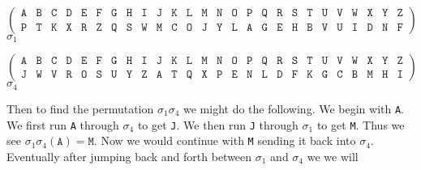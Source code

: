 \begin{center}
	\[
		\left(
		\begin{array}{llllllllllllllllllllllllll}
				\texttt{A} & \texttt{B} & \texttt{C} & \texttt{D} &
				\texttt{E} & \texttt{F} & \texttt{G} & \texttt{H} &
				\texttt{I} & \texttt{J} & \texttt{K} & \texttt{L} &
				\texttt{M} & \texttt{N} & \texttt{O} & \texttt{P} &
				\texttt{Q} & \texttt{R} & \texttt{S} & \texttt{T} &
				\texttt{U} & \texttt{V} & \texttt{W} & \texttt{X} &
				\texttt{Y} & \texttt{Z}                             \\
				\texttt{P} & \texttt{T} & \texttt{K} & \texttt{X} &
				\texttt{R} & \texttt{Z} & \texttt{Q} & \texttt{S} &
				\texttt{W} & \texttt{M} & \texttt{C} & \texttt{O} &
				\texttt{J} & \texttt{Y} & \texttt{L} & \texttt{A} &
				\texttt{G} & \texttt{E} & \texttt{H} & \texttt{B} &
				\texttt{V} & \texttt{U} & \texttt{I} & \texttt{D} &
				\texttt{N} & \texttt{F}
			\end{array}
		\right)
	\]
	$\sigma_1$
\end{center}
\begin{center}
	\[
		\left(
		\begin{array}{llllllllllllllllllllllllll}
				\texttt{A} & \texttt{B} & \texttt{C} & \texttt{D} &
				\texttt{E} & \texttt{F} & \texttt{G} & \texttt{H} &
				\texttt{I} & \texttt{J} & \texttt{K} & \texttt{L} &
				\texttt{M} & \texttt{N} & \texttt{O} & \texttt{P} &
				\texttt{Q} & \texttt{R} & \texttt{S} & \texttt{T} &
				\texttt{U} & \texttt{V} & \texttt{W} & \texttt{X} &
				\texttt{Y} & \texttt{Z}                             \\
				\texttt{J} & \texttt{W} & \texttt{V} & \texttt{R} &
				\texttt{O} & \texttt{S} & \texttt{U} & \texttt{Y} &
				\texttt{Z} & \texttt{A} & \texttt{T} & \texttt{Q} &
				\texttt{X} & \texttt{P} & \texttt{E} & \texttt{N} &
				\texttt{L} & \texttt{D} & \texttt{F} & \texttt{K} &
				\texttt{G} & \texttt{C} & \texttt{B} & \texttt{M} &
				\texttt{H} & \texttt{I}
			\end{array}
		\right)
	\]
	$\sigma_4$
\end{center}
Then to find the permutation $\sigma_1\sigma_4$ we might do the
following. We begin with \texttt{A}. We first run \texttt{A} through
$\sigma_4$ to get \texttt{J}. We then run \texttt{J} through
$\sigma_1$ to get \texttt{M}. Thus we see
$\sigma_1\sigma_4(\texttt{A}) = \texttt{M}$. Now we would continue
with \texttt{M} sending it back into $\sigma_4$. Eventually after
jumping back and forth between $\sigma_1$ and $\sigma_4$ we we will
